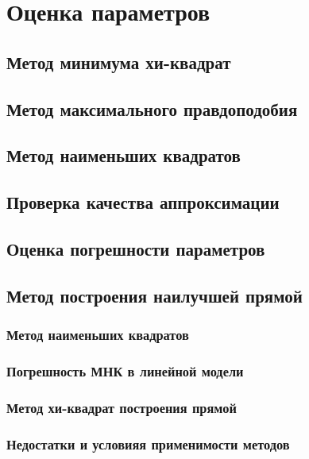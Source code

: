 \documentclass[12pt]{article}
\begin{document}
  \section{Оценка параметров}

    \subsection{Метод минимума хи-квадрат}

    \subsection{Метод максимального правдоподобия}

    \subsection{Метод наименьших квадратов}

    \subsection{Проверка качества аппроксимации}

    \subsection{Оценка погрешности параметров}

    \subsection{Метод построения наилучшей прямой}

      \subsubsection{Метод наименьших квадратов}

      \subsubsection{Погрешность МНК в линейной модели}

      \subsubsection{Метод хи-квадрат построения прямой}

      \subsubsection{Недостатки и условияя применимости методов}
\end{document}

